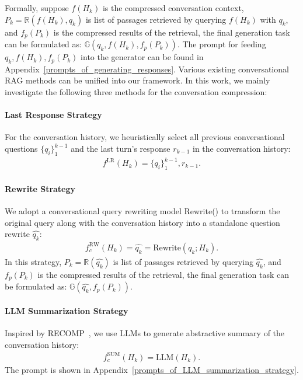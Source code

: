 \documentclass[11pt]{article}
\begin{document}
Formally, suppose $f(H_k)$ is the compressed conversation context, $P_k=\mathbb{R} (f(H_k), q_k)$ is list of passages retrieved by querying $f(H_k)$ with $q_k$, and $f_{p}(P_k)$ is the compressed results of the retrieval,
the final generation task can be formulated as:
$\mathbb{G}(q_k, f(H_k), f_{p}(P_k)) $. The prompt for feeding $q_k, f(H_k), f_{p}(P_k)$ into the generator can be found in Appendix~\ref{prompts_of_generating_responses}.
%
Various existing conversational RAG methods can be unified into our framework. In this work, we mainly investigate the following three methods for the conversation compression:

\paragraph{Last Response Strategy} 
For the conversation history, 
we heuristically select all previous conversational questions $\{q_{i}\}_{1}^{k-1}$ and the last turn's response $r_{k-1} $ in the conversation history:
\begin{eqnarray}
    f^{\text{LR}}(H_k)=\{q_{i}\}_{1}^{k-1},r_{k-1}.
\end{eqnarray}

\paragraph{Rewrite Strategy}
We adopt a conversational query rewriting model Rewrite() to transform the original query along with the conversation history into a standalone question
rewrite $\hat{q_k}$:
\begin{eqnarray}
    f_{c}^{\text{RW}}(H_k) =\hat{q_k} = \text{Rewrite}\left(q_k;H_k \right).    
\end{eqnarray}
In this strategy, $P_k=\mathbb{R} (\hat{q_k})$ is list of passages retrieved by querying $\hat{q_k}$, and $f_{p}(P_k)$ is the compressed results of the retrieval,
the final generation task can be formulated as:
$\mathbb{G}(\hat{q_k}, f_{p}(P_k)) $.

\paragraph{LLM Summarization Strategy}
Inspired by RECOMP~\citep{xu_recomp}, we use LLMs to generate abstractive summary of the conversation history:
\begin{eqnarray}
    f_{c}^{\text{SUM}}(H_k) = \text{LLM}(H_{k}).
\end{eqnarray}
The prompt is shown in Appendix~\ref{prompts_of_LLM_summarization_strategy}.
\end{document}
